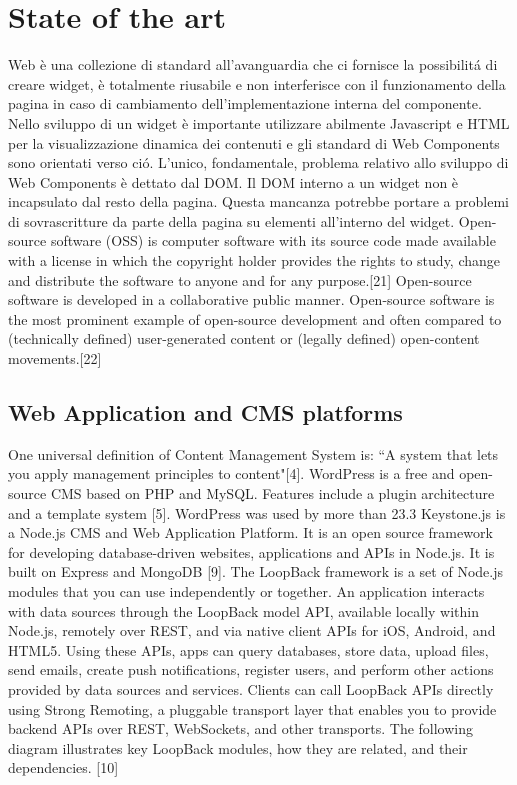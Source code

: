 \documentclass{sig-alternate}
\begin{document}
\section{State of the art}

Web  \`e una collezione di standard all'avanguardia che ci fornisce la possibilit\'a di creare widget, \`e totalmente riusabile e non interferisce con il funzionamento della pagina in caso di cambiamento dell'implementazione interna del componente.
Nello sviluppo di un widget \`e importante utilizzare abilmente Javascript e HTML per la visualizzazione dinamica dei contenuti e gli standard di Web Components sono orientati verso ci\'o. L'unico, fondamentale, problema relativo allo sviluppo di Web Components \`e dettato dal DOM. Il DOM interno a un widget non \`e incapsulato dal resto della pagina. Questa mancanza potrebbe portare a problemi di sovrascritture da parte della pagina su elementi all'interno del widget.
Open-source software (OSS) is computer software with its source code made available with a license in which the copyright holder provides the rights to study, change and distribute the software to anyone and for any purpose.[21] Open-source software is developed in a collaborative public manner. Open-source software is the most prominent example of open-source development and often compared to (technically defined) user-generated content or (legally defined) open-content movements.[22]

\subsection{Web Application and CMS platforms}

One universal definition of Content Management System is: ``A system that lets you apply management principles to content"[4].
WordPress is a free and open-source CMS based on PHP and MySQL. Features include a plugin architecture and a template system [5]. WordPress was used by more than 23.3%
Keystone.js is a Node.js CMS and Web Application Platform. It is an open source framework for developing database-driven websites, applications and APIs in Node.js. It is built on Express and MongoDB [9].
The LoopBack framework is a set of Node.js modules that you can use independently or together.  
An application interacts with data sources through the LoopBack model API, available locally within Node.js, remotely over REST, and via native client APIs for iOS, Android, and HTML5. Using these APIs, apps can query databases, store data, upload files, send emails, create push notifications, register users, and perform other actions provided by data sources and services.
Clients can call LoopBack APIs directly using Strong Remoting, a pluggable transport layer that enables you to provide backend APIs over REST, WebSockets, and other transports.
The following diagram illustrates key LoopBack modules, how they are related, and their dependencies. [10]
\end{document}
